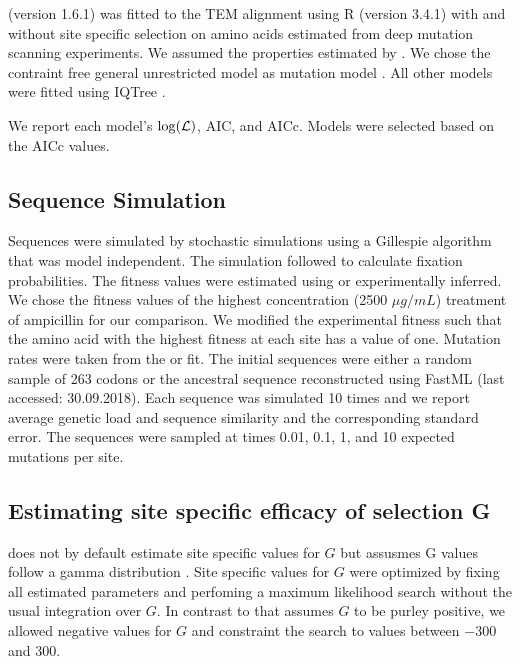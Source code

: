 \documentclass[12pt]{article}
\begin{document}
\selac (version 1.6.1) was fitted to the TEM alignment using R (version 3.4.1) \citep{rcore} with and without site specific selection on amino acids estimated from deep mutation scanning experiments.
We assumed the \PC properties estimated by \citet{grantham1974}.
We chose the contraint free  general unrestricted model \citep{yang1994} as mutation model .
All other models were fitted using IQTree \citep{nguyen2015}.

We report each model's $\log(\mathcal{L})$, AIC, and  AICc. 
Models were selected based on the AICc values.

\subsection*{Sequence Simulation}

Sequences were simulated by stochastic simulations using a Gillespie algorithm \citep{gillespie1976} that was model independent.
The simulation followed \citet{SellaAndHirsh2005} to calculate fixation probabilities.
The fitness values were estimated using \selac or experimentally inferred.
We chose the fitness values of the highest concentration (2500 $\mu g/mL$) treatment of ampicillin for our comparison.
We modified the experimental fitness such that the amino acid with the highest fitness at each site has a value of one.
Mutation rates were taken from the \selac or \selacDMS fit.
The initial sequences were either a random sample of 263 codons or the ancestral sequence reconstructed using FastML \citep{fastml} (last accessed: 30.09.2018).
Each sequence was simulated 10 times and we report average genetic load and sequence similarity and the corresponding standard error.
The sequences were sampled at times 0.01, 0.1, 1, and 10 expected mutations per site.

\subsection*{Estimating site specific efficacy of selection G}

\selac does not by default estimate site specific values for $G$ but assusmes G values follow a gamma distribution \citep{Felsenstein2001}.
Site specific values for $G$ were optimized by fixing all estimated parameters and perfoming a maximum likelihood search without the usual integration over $G$.
In contrast to \selac that assumes $G$ to be purley positive, we allowed negative values for $G$ and constraint the search to values between $-300$ and $300$.
\end{document}
